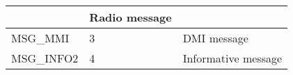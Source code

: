 \documentclass{template/openetcs_article}
\begin{document}
\begin{longtable}{|l|l|l|}
	&	\begin{minipage}[t]{0.30\linewidth} Radio message\end{minipage} \\
	\hline
		\begin{minipage}[t]{0.60\linewidth}	MSG\_MMI\end{minipage}
	&	\begin{minipage}[t]{0.15\linewidth} 3 	\end{minipage}
	&	\begin{minipage}[t]{0.30\linewidth} DMI message\end{minipage} \\
	\hline
		\begin{minipage}[t]{0.60\linewidth}	MSG\_INFO2\end{minipage}
	&	\begin{minipage}[t]{0.15\linewidth} 4 	\end{minipage}
	&	\begin{minipage}[t]{0.30\linewidth} Informative message\end{minipage} \\
	\hline
\end{longtable}
\end{document}
